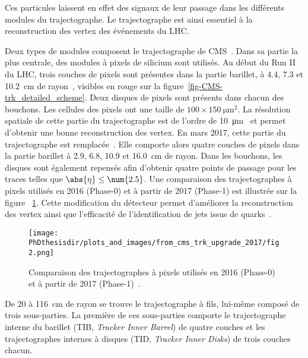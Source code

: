 Ces particules laissent en effet des signaux de leur passage dans les différents modules du trajectographe.
Le trajectographe est ainsi essentiel à la reconstruction des vertex des événements du LHC.
\par Deux types de modules composent le trajectographe de CMS~\cite{cms_paper,CERN-LHCC-98-006,CMS-TDR-11,CMS-TRK-11-001,CMS-TRK-17-001}.
Dans sa partie la plus centrale, des modules à pixels de silicium sont utilisés.
Au début du Run II du LHC, trois couches de pixels sont présentes dans la partie barillet, à \num{4.4}, \num{7.3} et \SI{10.2}{\centi\meter} de rayon~\cite{cms_paper}, visibles en rouge sur la figure~\ref{fig-CMS-trk_detailed_scheme}.
Deux disques de pixels sont présents dans chacun des bouchons.
Les cellules des pixels ont une taille de $\num{100}\times\SI{150}{\micro\meter^2}$.
La résolution spatiale de cette partie du trajectographe est de l'ordre de \SI{10}{\micro\meter}~\cite{cms_paper} et permet d'obtenir une bonne reconstruction des vertex.
En mars 2017, cette partie du trajectographe est remplacée~\cite{cms_trk_upgrade_2017}.
Elle comporte alors quatre couches de pixels dans la partie barillet à \num{2.9}, \num{6.8}, \num{10.9} et \SI{16.0}{\centi\meter} de rayon.
Dans les bouchons, les disques sont également repensés afin d'obtenir quatre points de passage pour les traces telles que $\abs{\eta}\leq\num{2.5}$.
Une comparaison des trajectographes à pixels utilisés en 2016 (Phase-0) et à partir de 2017 (Phase-1) est illustrée sur la figure ~\ref{fig-chapter-LHC-section-CMS-subsec-tracker-2017-upgrade}.
Cette modification du détecteur permet d'améliorer la reconstruction des vertex ainsi que l'efficacité de l'identification de jets issus de quarks~\quarkb.
\begin{figure}[h]
\centering
\texttt{[image: \\PhDthesisdir/plots\_and\_images/from\_cms\_trk\_upgrade\_2017/fig2.png]}
\caption[Comparaison des trajectographes à pixels utilisés en 2016 (Phase-0) et à partir de 2017 (Phase-1).]{Comparaison des trajectographes à pixels utilisés en 2016 (Phase-0) et à partir de 2017 (Phase-1)~\cite{cms_trk_upgrade_2017}.}
\label{fig-chapter-LHC-section-CMS-subsec-tracker-2017-upgrade}
\end{figure}
\par De \num{20} à \SI{116}{\centi\meter} de rayon se trouve le trajectographe à fils, lui-même composé de trois sous-parties.
La première de ces sous-parties comporte le trajectographe interne du barillet (TIB, \emph{Tracker Inner Barrel}) de quatre couches et les trajectographes internes à disques (TID, \emph{Tracker Inner Disks}) de trois couches chacun.
